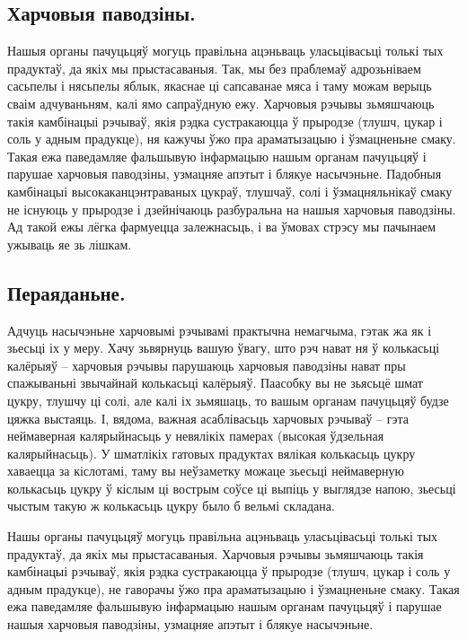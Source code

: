 \subsection{Харчовыя паводзіны.}
Нашыя органы пачуцьцяў могуць правільна ацэньваць уласьцівасьці толькі тых прадуктаў, да якіх мы прыстасаваныя. Так, мы без праблемаў адрозьніваем сасьпелы і нясьпелы яблык, якаснае ці сапсаванае мяса і таму можам верыць сваім адчуваньням, калі ямо сапраўдную ежу. Харчовыя рэчывы зьмяшчаюць такія камбінацыі рэчываў, якія рэдка сустракаюцца ў прыродзе (тлушч, цукар і соль у адным прадукце), ня кажучы ўжо пра араматызацыю і ўзмацненьне смаку. Такая ежа паведамляе фальшывую інфармацыю нашым органам пачуцьцяў і парушае харчовыя паводзіны, узмацняе апэтыт і блякуе насычэньне. Падобныя камбінацыі высокаканцэнтраваных цукраў, тлушчаў, солі і ўзмацняльнікаў смаку не існуюць у прыродзе і дзейнічаюць разбуральна на нашыя харчовыя паводзіны. Ад такой ежы лёгка фармуецца залежнасьць, і ва ўмовах стрэсу мы пачынаем ужываць яе зь лішкам.

\subsection{Пераяданьне.}
Адчуць насычэньне харчовымі рэчывамі практычна немагчыма, гэтак жа як і зьесьці іх у меру. Хачу зьвярнуць вашую ўвагу, што рэч нават ня ў колькасьці калёрыяў – харчовыя рэчывы парушаюць харчовыя паводзіны нават пры спажываньні звычайнай колькасьці калёрыяў. Паасобку вы не зьясьцё шмат цукру, тлушчу ці солі, але калі іх зьмяшаць, то вашым органам пачуцьцяў будзе цяжка выстаяць. І, вядома, важная асаблівасьць харчовых рэчываў – гэта неймаверная калярыйнасьць у невялікіх памерах (высокая ўдзельная калярыйнасьць). У шматлікіх гатовых прадуктах вялікая колькасьць цукру хаваецца за кіслотамі, таму вы неўзаметку можаце зьесьці неймаверную колькасьць цукру ў кіслым ці вострым соўсе ці выпіць у выглядзе напою, зьесьці чыстым такую ж колькасьць цукру было б вельмі складана.

Нашы органы пачуцьцяў могуць правільна ацэньваць уласьцівасьці толькі тых прадуктаў, да якіх мы прыстасаваныя. Харчовыя рэчывы зьмяшчаюць такія камбінацыі рэчываў, якія рэдка сустракаюцца ў прыродзе (тлушч, цукар і соль у адным прадукце), не гаворачы ўжо пра араматызацыю і ўзмацненьне смаку. Такая ежа паведамляе фальшывую інфармацыю нашым органам пачуцьцяў і парушае нашыя харчовыя паводзіны, узмацняе апэтыт і блякуе насычэньне.

